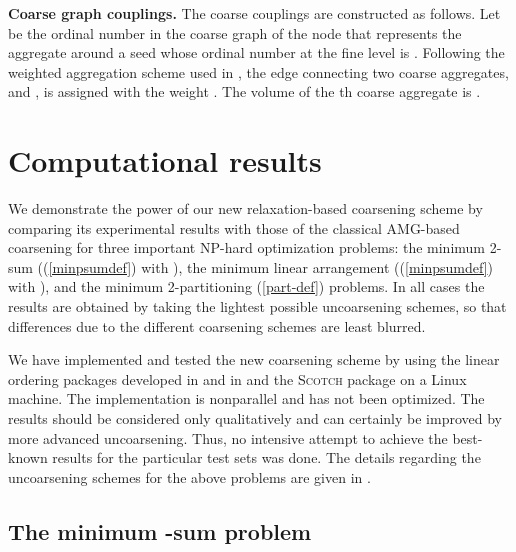 \documentclass[final]{siamltex}
\newcommand{\scotch}{\textsc{Scotch}}
\begin{document}
\par {\bf Coarse graph couplings.} The coarse couplings are constructed as follows. Let  be
the ordinal number in the coarse graph of the node that represents
the aggregate around a seed whose ordinal number at the fine level
is . Following the weighted aggregation scheme used in
\cite{sharon}, the edge connecting two coarse aggregates,  and , is assigned with the weight
. The volume
of the th coarse aggregate is .



\section{Computational results}\label{results}
\par We demonstrate the power of our new relaxation-based coarsening scheme by comparing its experimental
results with those of the
classical AMG-based coarsening
for three important NP-hard optimization problems: the minimum 2-sum
((\ref{minpsumdef}) with ), the minimum linear arrangement ((\ref{minpsumdef}) with ), and the minimum 2-partitioning (\ref{part-def}) problems. In all cases
the results are obtained by taking the lightest possible
uncoarsening schemes, so that differences due to the different coarsening schemes are least blurred.
\par We have implemented and tested the new coarsening scheme by
using the linear ordering packages developed in \cite{safro2004} and in \cite{safro2003} and the \scotch{} package \cite{webscotch} on a Linux
machine. The implementation is nonparallel and has not been
optimized. The results should be considered only qualitatively and
can certainly be improved by more advanced uncoarsening.
Thus, no intensive attempt to achieve the best-known
results for the particular test sets was done. The details
regarding the uncoarsening schemes for the above problems are
given in \cite{safro2004,safro2003,cheval-mlpartcompar}.
\subsection{The minimum -sum problem}
\end{document}
